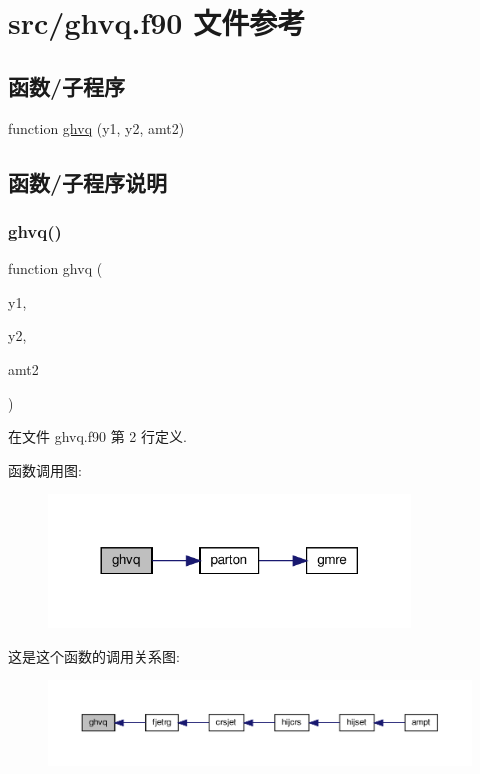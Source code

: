 \hypertarget{ghvq_8f90}{}\section{src/ghvq.f90 文件参考}
\label{ghvq_8f90}
\subsection*{函数/子程序}
\begin{DoxyCompactItemize}
\item 
function \mbox{\hyperlink{ghvq_8f90_a69060c08000f9bb4f4e9a8973da87674}{ghvq}} (y1, y2, amt2)
\end{DoxyCompactItemize}


\subsection{函数/子程序说明}
\mbox{\label{ghvq_8f90_a69060c08000f9bb4f4e9a8973da87674}} 
\subsubsection{\texorpdfstring{ghvq()}{ghvq()}}
{\footnotesize\ttfamily function ghvq (\begin{DoxyParamCaption}\item[{}]{y1,  }\item[{}]{y2,  }\item[{}]{amt2 }\end{DoxyParamCaption})}



在文件 ghvq.\+f90 第 2 行定义.

函数调用图\+:
\nopagebreak
\begin{figure}[H]
\begin{center}
\leavevmode
\includegraphics[width=272pt]{ghvq_8f90_a69060c08000f9bb4f4e9a8973da87674_cgraph}
\end{center}
\end{figure}
这是这个函数的调用关系图\+:
\nopagebreak
\begin{figure}[H]
\begin{center}
\leavevmode
\includegraphics[width=350pt]{ghvq_8f90_a69060c08000f9bb4f4e9a8973da87674_icgraph}
\end{center}
\end{figure}
